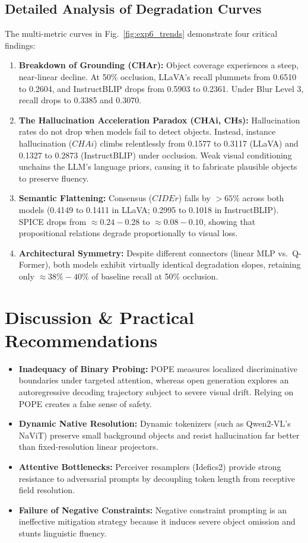 \documentclass[conference]{IEEEtran}
\begin{document}
\subsection{Detailed Analysis of Degradation Curves}
The multi-metric curves in Fig.~\ref{fig:exp6_trends} demonstrate four critical findings:
\begin{enumerate}
    \item \textbf{Breakdown of Grounding (CHAr):} Object coverage experiences a steep, near-linear decline. At 50\% occlusion, LLaVA's recall plummets from 0.6510 to 0.2604, and InstructBLIP drops from 0.5903 to 0.2361. Under Blur Level 3, recall drops to 0.3385 and 0.3070.
    \item \textbf{The Hallucination Acceleration Paradox (CHAi, CHs):} Hallucination rates do not drop when models fail to detect objects. Instead, instance hallucination ($CHAi$) climbs relentlessly from 0.1577 to 0.3117 (LLaVA) and 0.1327 to 0.2873 (InstructBLIP) under occlusion. Weak visual conditioning unchains the LLM's language priors, causing it to fabricate plausible objects to preserve fluency.
    \item \textbf{Semantic Flattening:} Consensus ($CIDEr$) falls by $>65\%$ across both models (0.4149 to 0.1411 in LLaVA; 0.2995 to 0.1018 in InstructBLIP). SPICE drops from $\approx 0.24-0.28$ to $\approx 0.08-0.10$, showing that propositional relations degrade proportionally to visual loss.
    \item \textbf{Architectural Symmetry:} Despite different connectors (linear MLP vs.\ Q-Former), both models exhibit virtually identical degradation slopes, retaining only $\approx 38\%-40\%$ of baseline recall at 50\% occlusion.
\end{enumerate}

\section{Discussion \& Practical Recommendations}
\begin{itemize}
    \item \textbf{Inadequacy of Binary Probing:} POPE measures localized discriminative boundaries under targeted attention, whereas open generation explores an autoregressive decoding trajectory subject to severe visual drift. Relying on POPE creates a false sense of safety.
    \item \textbf{Dynamic Native Resolution:} Dynamic tokenizers (such as Qwen2-VL's NaViT) preserve small background objects and resist hallucination far better than fixed-resolution linear projectors.
    \item \textbf{Attentive Bottlenecks:} Perceiver resamplers (Idefics2) provide strong resistance to adversarial prompts by decoupling token length from receptive field resolution.
    \item \textbf{Failure of Negative Constraints:} Negative constraint prompting is an ineffective mitigation strategy because it induces severe object omission and stunts linguistic fluency.
\end{itemize}
\end{document}
